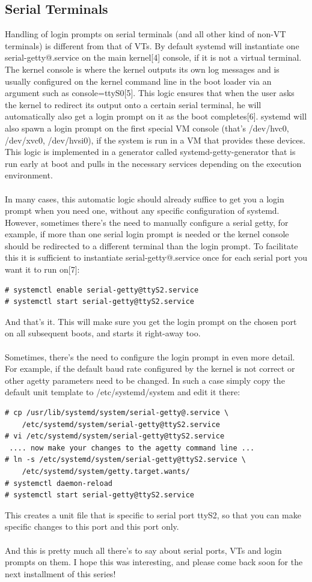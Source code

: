 \documentclass[titlepage]{article}
\begin{document}
\subsection{Serial Terminals}
Handling of login prompts on serial terminals (and all other kind of non-VT terminals) is different from that of VTs. By default systemd will instantiate one serial-getty@.service on the main kernel[4] console, if it is not a virtual terminal. The kernel console is where the kernel outputs its own log messages and is usually configured on the kernel command line in the boot loader via an argument such as console=ttyS0[5]. This logic ensures that when the user asks the kernel to redirect its output onto a certain serial terminal, he will automatically also get a login prompt on it as the boot completes[6]. systemd will also spawn a login prompt on the first special VM console (that's /dev/hvc0, /dev/xvc0, /dev/hvsi0), if the system is run in a VM that provides these devices. This logic is implemented in a generator called systemd-getty-generator that is run early at boot and pulls in the necessary services depending on the execution environment.
\\
\\
In many cases, this automatic logic should already suffice to get you a login prompt when you need one, without any specific configuration of systemd. However, sometimes there's the need to manually configure a serial getty, for example, if more than one serial login prompt is needed or the kernel console should be redirected to a different terminal than the login prompt. To facilitate this it is sufficient to instantiate serial-getty@.service once for each serial port you want it to run on[7]:
\begin{lstlisting}
# systemctl enable serial-getty@ttyS2.service
# systemctl start serial-getty@ttyS2.service
\end{lstlisting}
And that's it. This will make sure you get the login prompt on the chosen port on all subsequent boots, and starts it right-away too.
\\
\\
Sometimes, there's the need to configure the login prompt in even more detail. For example, if the default baud rate configured by the kernel is not correct or other agetty parameters need to be changed. In such a case simply copy the default unit template to /etc/systemd/system and edit it there:
\begin{lstlisting}
# cp /usr/lib/systemd/system/serial-getty@.service \
    /etc/systemd/system/serial-getty@ttyS2.service
# vi /etc/systemd/system/serial-getty@ttyS2.service
 .... now make your changes to the agetty command line ...
# ln -s /etc/systemd/system/serial-getty@ttyS2.service \ 
    /etc/systemd/system/getty.target.wants/
# systemctl daemon-reload
# systemctl start serial-getty@ttyS2.service
\end{lstlisting}
This creates a unit file that is specific to serial port ttyS2, so that you can make specific changes to this port and this port only.
\\
\\
And this is pretty much all there's to say about serial ports, VTs and login prompts on them. I hope this was interesting, and please come back soon for the next installment of this series!
\end{document}
